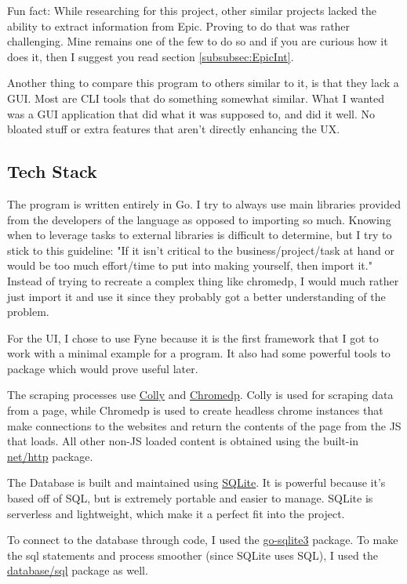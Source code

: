 Fun fact: While researching for this project, other similar
projects lacked the ability to extract information from Epic.
Proving to do that was rather challenging. Mine remains one of the
few to do so and if you are curious how it does it, then I suggest
you read section \ref{subsubsec:EpicInt}.

Another thing to compare this program to others similar to it, is
that they lack a GUI. Most are CLI tools that do something somewhat similar.
What I wanted was a GUI application that did what it was supposed to,
and did it well. No bloated stuff or extra features that aren't
directly enhancing the UX.

\subsection{Tech Stack}

The program is written entirely in Go. I try to always use main
libraries provided from the developers of the language as opposed to
importing so much. Knowing when to leverage tasks to external
libraries is difficult to determine, but I try to stick to this guideline:
"If it isn't critical to the business/project/task at hand or would be
too much effort/time to put into making yourself, then import it."
Instead of trying to recreate a complex thing like chromedp, I would
much rather just import it and use it since they probably got a
better understanding of the problem.

For the UI, I chose to use Fyne because it is the first framework
that I got to work with a minimal example for a program. It also had
some powerful tools to package which would prove useful later.

The scraping processes use \href{http://go-colly.org/docs/}{Colly}
and \href{https://pkg.go.dev/github.com/chromedp/chromedp}{Chromedp}.
Colly is used for scraping data from a page, while Chromedp is used
to create headless chrome instances that make connections to the
websites and return the contents of the page from the JS that loads.
All other non-JS loaded content is obtained using the built-in
\href{https://pkg.go.dev/net/http}{net/http} package.

The Database is built and maintained using
\href{https://www.sqlite.org/index.html}{SQLite}. It is powerful
because it's based off of SQL, but is extremely portable and easier to manage.
SQLite is serverless and lightweight, which make it a perfect fit
into the project.

To connect to the database through code, I used the
\href{https://pkg.go.dev/github.com/mattn/go-sqlite3}{go-sqlite3} package.
To make the sql statements and process smoother (since SQLite uses
SQL), I used the \href{https://pkg.go.dev/database/sql}{database/sql}
package as well.

